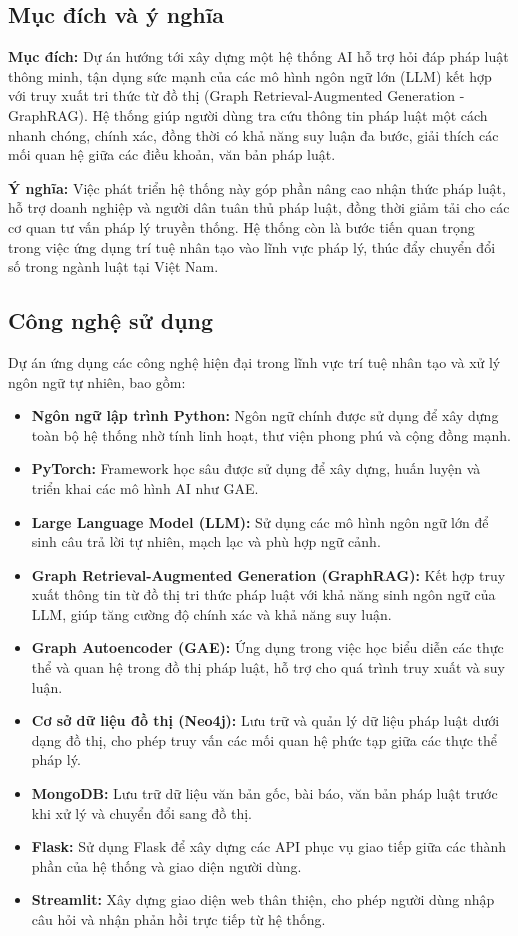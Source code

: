 \documentclass[a4paper]{article}
\begin{document}
\subsection{Mục đích và ý nghĩa}
\textbf{Mục đích:} Dự án hướng tới xây dựng một hệ thống AI hỗ trợ hỏi đáp pháp luật thông minh, tận dụng sức mạnh của các mô hình ngôn ngữ lớn (LLM) kết hợp với truy xuất tri thức từ đồ thị (Graph Retrieval-Augmented Generation - GraphRAG). Hệ thống giúp người dùng tra cứu thông tin pháp luật một cách nhanh chóng, chính xác, đồng thời có khả năng suy luận đa bước, giải thích các mối quan hệ giữa các điều khoản, văn bản pháp luật.

\textbf{Ý nghĩa:} Việc phát triển hệ thống này góp phần nâng cao nhận thức pháp luật, hỗ trợ doanh nghiệp và người dân tuân thủ pháp luật, đồng thời giảm tải cho các cơ quan tư vấn pháp lý truyền thống. Hệ thống còn là bước tiến quan trọng trong việc ứng dụng trí tuệ nhân tạo vào lĩnh vực pháp lý, thúc đẩy chuyển đổi số trong ngành luật tại Việt Nam.

\subsection{Công nghệ sử dụng}
Dự án ứng dụng các công nghệ hiện đại trong lĩnh vực trí tuệ nhân tạo và xử lý ngôn ngữ tự nhiên, bao gồm:
\begin{itemize}
    \item \textbf{Ngôn ngữ lập trình Python:} Ngôn ngữ chính được sử dụng để xây dựng toàn bộ hệ thống nhờ tính linh hoạt, thư viện phong phú và cộng đồng mạnh.
    \item \textbf{PyTorch:} Framework học sâu được sử dụng để xây dựng, huấn luyện và triển khai các mô hình AI như GAE.
    \item \textbf{Large Language Model (LLM):} Sử dụng các mô hình ngôn ngữ lớn để sinh câu trả lời tự nhiên, mạch lạc và phù hợp ngữ cảnh.
    \item \textbf{Graph Retrieval-Augmented Generation (GraphRAG):} Kết hợp truy xuất thông tin từ đồ thị tri thức pháp luật với khả năng sinh ngôn ngữ của LLM, giúp tăng cường độ chính xác và khả năng suy luận.
    \item \textbf{Graph Autoencoder (GAE):} Ứng dụng trong việc học biểu diễn các thực thể và quan hệ trong đồ thị pháp luật, hỗ trợ cho quá trình truy xuất và suy luận.
    \item \textbf{Cơ sở dữ liệu đồ thị (Neo4j):} Lưu trữ và quản lý dữ liệu pháp luật dưới dạng đồ thị, cho phép truy vấn các mối quan hệ phức tạp giữa các thực thể pháp lý.
    \item \textbf{MongoDB:} Lưu trữ dữ liệu văn bản gốc, bài báo, văn bản pháp luật trước khi xử lý và chuyển đổi sang đồ thị.
    \item \textbf{Flask:} Sử dụng Flask để xây dựng các API phục vụ giao tiếp giữa các thành phần của hệ thống và giao diện người dùng.
    \item \textbf{Streamlit:} Xây dựng giao diện web thân thiện, cho phép người dùng nhập câu hỏi và nhận phản hồi trực tiếp từ hệ thống.
\end{itemize}
\end{document}
